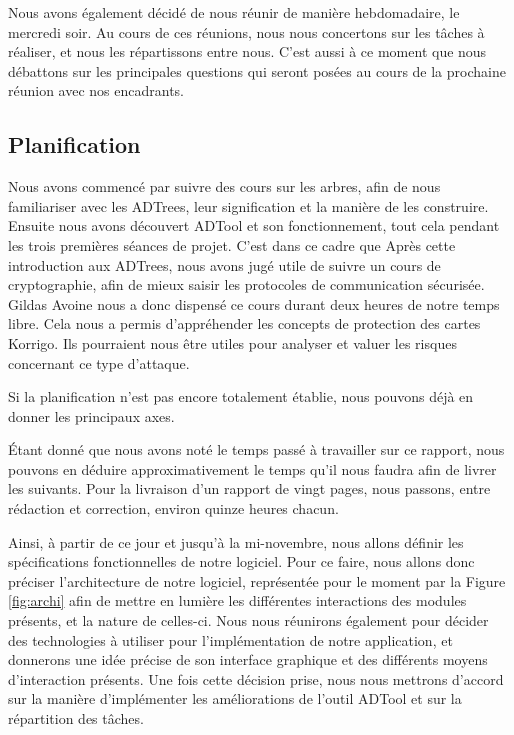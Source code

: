 	    Nous avons également décidé de nous réunir de manière hebdomadaire, le mercredi soir. Au cours de ces réunions, nous nous concertons sur les tâches à réaliser, et nous les répartissons entre nous. C'est aussi à ce moment que nous débattons sur les principales questions qui seront posées au cours de la prochaine réunion avec nos encadrants.

	    
	\subsection{Planification}
		
		Nous avons commencé par suivre des cours sur les arbres, afin de nous familiariser avec les ADTrees, leur signification et la manière de les construire. Ensuite nous avons découvert ADTool et son fonctionnement, tout cela pendant les trois premières séances de projet. C'est dans ce cadre que 	    
	    Après cette introduction aux ADTrees, nous avons jugé utile de suivre un cours de cryptographie, afin de mieux saisir les protocoles de communication sécurisée. Gildas Avoine nous a donc dispensé ce cours durant deux heures de notre temps libre. Cela nous a permis d'appréhender les concepts de protection des cartes Korrigo. Ils pourraient nous être utiles pour analyser et valuer les risques concernant ce type d'attaque.
			
		Si la planification n'est pas encore totalement établie, nous pouvons déjà en donner les principaux axes.

		Étant donné que nous avons noté le temps passé à travailler sur ce rapport, nous pouvons en déduire approximativement le temps qu'il nous faudra afin de livrer les suivants. Pour la livraison d'un rapport de vingt pages, nous passons, entre rédaction et correction, environ quinze heures chacun.

		Ainsi, à partir de ce jour et jusqu'à la mi-novembre, nous allons définir les spécifications fonctionnelles de notre logiciel.
		Pour ce faire, nous allons donc préciser l'architecture de notre logiciel, représentée pour le moment par la Figure \ref{fig:archi} afin de mettre en lumière les différentes interactions des modules présents, et la nature de celles-ci. Nous nous réunirons également pour décider des technologies à utiliser pour l'implémentation de notre application, et donnerons une idée précise de son interface graphique et des différents moyens d'interaction présents.
		Une fois cette décision prise, nous nous mettrons d'accord sur la manière d'implémenter les améliorations de l'outil ADTool et sur la répartition des tâches.

